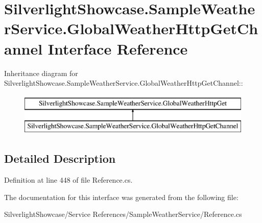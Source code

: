 \hypertarget{interface_silverlight_showcase_1_1_sample_weather_service_1_1_global_weather_http_get_channel}{
\section{SilverlightShowcase.SampleWeatherService.GlobalWeatherHttpGetChannel Interface Reference}
\label{interface_silverlight_showcase_1_1_sample_weather_service_1_1_global_weather_http_get_channel}
}
Inheritance diagram for SilverlightShowcase.SampleWeatherService.GlobalWeatherHttpGetChannel::\begin{figure}[H]
\begin{center}
\leavevmode
\includegraphics[height=2cm]{interface_silverlight_showcase_1_1_sample_weather_service_1_1_global_weather_http_get_channel}
\end{center}
\end{figure}


\subsection{Detailed Description}


Definition at line 448 of file Reference.cs.

The documentation for this interface was generated from the following file:\begin{DoxyCompactItemize}
\item 
SilverlightShowcase/Service References/SampleWeatherService/Reference.cs\end{DoxyCompactItemize}
